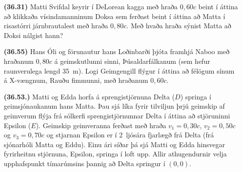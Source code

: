 \begin{enumerate}[label = \textbf{(\alph*)}]

\item[\textbf{(36.31)}] Matti Svifdal keyrir í DeLorean kagga með hraða $0,60c$ beint í áttina að klikkaða vísindamanninum Doksa sem ferðast beint í áttina að Matta í risastórri járnbrautalest með hraða $0,80c$. Með hvaða hraða sýnist Matta að Doksi nálgist hann?

\item[\textbf{(36.55)}] Hans Óli og förunautur hans Loðinbarði þjóta framhjá Naboo með hraðanum $0,80c$ á geimskutlunni sinni, Þúsaldarfálkanum (sem hefur raunverulega lengd \SI{35}{m}). Logi Geimgengill flýgur í áttina að félögum sínum á X-vængnum, Rauðu fimmunni, með hraðanum $0,60c$.

\item[\textbf{(36.53.)}] Matti og Edda horfa á sprengistjörnuna Delta ($D$) springa í geimsjónaukanum hans Matta. Þau sjá líka fyrir tilviljun þrjú geimskip af geimverum flýja frá sólkerfi sprengistjörnunnar Delta í áttina að stjöruninni Epsilon ($E$). Geimskip geimveranna ferðast með hraða $v_1 = 0,30c$, $v_2 = 0,50c$ og $v_3 = 0,70c$ og stjarnan Epsilon er í \SI{2}{ljósára} fjarlægð frá Delta (frá sjónarhóli Matta og Eddu). Einu ári síðar þá sjá Matti og Edda hinsvegar fyrirheitnu stjörnuna, Epsilon, springa í loft upp. Allir athugendurnir velja upphafspunkt tímarúmsins þannig að Delta springur í $(0,0)$.


\end{enumerate}
